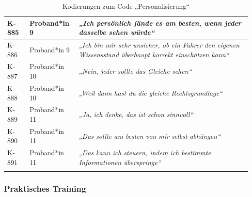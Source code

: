 {\begin{xltabular}{\textwidth}{
    |P{0.10\textwidth}
    |P{0.17\textwidth}
    |Y|
}
\hline
K-885 & Proband*in 9 & \textit{„Ich persönlich fände es am besten, wenn jeder dasselbe sehen würde“} \\
\hline
K-886 & Proband*in 9 & \textit{„Ich bin mir sehr unsicher, ob ein Fahrer den eigenen Wissensstand überhaupt korrekt einschätzen kann“} \\
\hline
K-887 & Proband*in 10 & \textit{„Nein, jeder sollte das Gleiche sehen“} \\
\hline
K-888 & Proband*in 10 & \textit{„Weil dann hast du die gleiche Rechtsgrundlage“} \\
\hline
K-889 & Proband*in 11 & \textit{„Ja, ich denke, das ist schon sinnvoll“} \\
\hline
K-890 & Proband*in 11 & \textit{„Das sollte am besten von mir selbst abhängen“} \\
\hline
K-891 & Proband*in 11 & \textit{„Das kann ich steuern, indem ich bestimmte Informationen überspringe“} \\
\hline
\caption{Kodierungen zum Code „Personalisierung“}\label{tab:kodiernachweis-personalisierung}\\
\end{xltabular}
}

\clearpage
\subsubsection{Praktisches Training}

